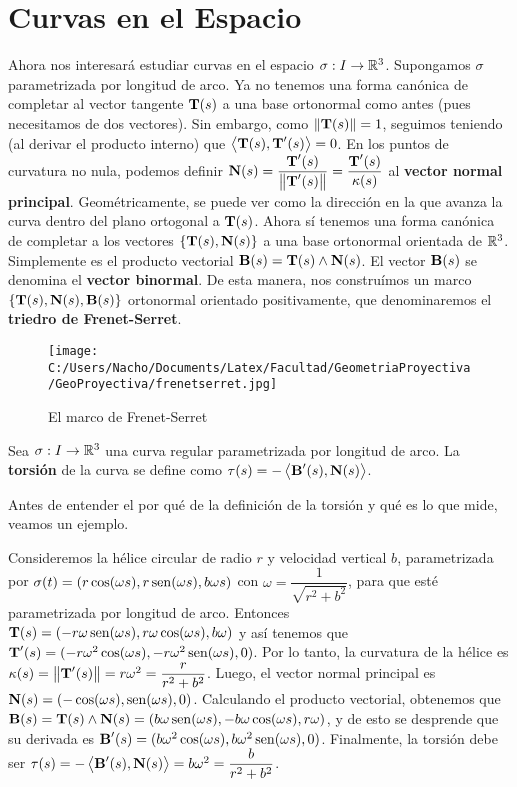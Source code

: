 \section{Curvas en el Espacio}

Ahora nos interesará estudiar curvas en el espacio $\sigma:I\to\mathbb{R}^3$. Supongamos $\sigma$ parametrizada por longitud de arco. Ya no tenemos una forma canónica de completar al vector tangente $\operatorname{\mathbf{T}}(s)$ a una base ortonormal como antes (pues necesitamos de dos vectores). Sin embargo, como $\left\| \operatorname{\mathbf{T}}(s) \right\|=1$, seguimos teniendo (al derivar el producto interno) que $\left\langle \operatorname{\mathbf{T}}(s),\operatorname{\mathbf{T}}'(s) \right\rangle=0$. En los puntos de curvatura no nula, podemos definir $\operatorname{\mathbf{N}}(s)=\dfrac{\operatorname{\mathbf{T}}'(s)}{\left\| \operatorname{\mathbf{T}}'(s) \right\|} = \dfrac{\operatorname{\mathbf{T}}'(s)}{\kappa(s)}$ al \textbf{vector normal principal}. Geométricamente, se puede ver como la dirección en la que avanza la curva dentro del plano ortogonal a $\operatorname{\mathbf{T}}(s)$. Ahora sí tenemos una forma canónica de completar a los vectores $\{\operatorname{\mathbf{T}}(s),\operatorname{\mathbf{N}}(s)\}$ a una base ortonormal orientada de $\mathbb{R}^3$. Simplemente es el producto vectorial $\operatorname{\mathbf{B}}(s)=\operatorname{\mathbf{T}}(s)\wedge\operatorname{\mathbf{N}}(s)$. El vector $\operatorname{\mathbf{B}}(s)$ se denomina el \textbf{vector binormal}.  De esta manera, nos construímos un marco $\{\operatorname{\mathbf{T}}(s),\operatorname{\mathbf{N}}(s),\operatorname{\mathbf{B}}(s)\}$ ortonormal orientado positivamente, que denominaremos el \textbf{triedro de Frenet-Serret}.

\begin{figure}[h]
	\centering
		\texttt{[image: C:/Users/Nacho/Documents/Latex/Facultad/GeometriaProyectiva/GeoProyectiva/frenetserret.jpg]}
	\caption{El marco de Frenet-Serret}
	\label{fig:frenetserret}
\end{figure}

\begin{defn}
Sea $\sigma:I\to\mathbb{R}^3$ una curva regular parametrizada por longitud de arco. La \textbf{torsión} de la curva se define como $\tau(s)=-\left\langle \operatorname{\mathbf{B}}'(s),\operatorname{\mathbf{N}}(s) \right\rangle$.
\end{defn}

Antes de entender el por qué de la definición de la torsión y qué es lo que mide, veamos un ejemplo.

\begin{ex}
Consideremos la hélice circular de radio $r$ y velocidad vertical $b$, parametrizada por $\sigma(t) = (r\cos(\omega s),r\operatorname{sen}(\omega s),b\omega s)$ con $\omega = \dfrac{1}{\sqrt{r^2+b^2}}$, para que esté parametrizada por longitud de arco. Entonces $\operatorname{\mathbf{T}}(s)=(-r\omega\operatorname{sen}(\omega s),r\omega\cos(\omega s),b\omega)$ y así tenemos que $\operatorname{\mathbf{T}}'(s)=(-r\omega^2\cos(\omega s),-r\omega^2 \operatorname{sen}(\omega s),0)$. Por lo tanto, la curvatura de la hélice es $\kappa(s)=\left\| \operatorname{\mathbf{T}}'(s) \right\| = r\omega^2 = \dfrac{r}{r^2+b^2}$. Luego, el vector normal principal es $\operatorname{\mathbf{N}}(s)=(-\cos(\omega s),\operatorname{sen}(\omega s),0)$. Calculando el producto vectorial, obtenemos que $\operatorname{\mathbf{B}}(s)=\operatorname{\mathbf{T}}(s)\wedge\operatorname{\mathbf{N}}(s)=(b\omega\operatorname{sen}(\omega s),-b\omega\cos(\omega s),r\omega)$, y de esto se desprende que su derivada es $\operatorname{\mathbf{B}}'(s)=(b\omega^2\cos(\omega s),b\omega^2 \operatorname{sen}(\omega s),0)$. Finalmente, la torsión debe ser $\tau(s)=-\left\langle \operatorname{\mathbf{B}}'(s),\operatorname{\mathbf{N}}(s) \right\rangle = b\omega^2 = \dfrac{b}{r^2+b^2}$.
\end{ex}

